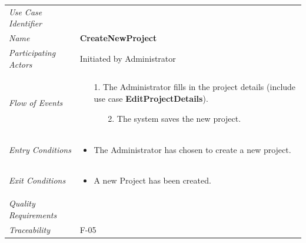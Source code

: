 \documentclass[12pt,letterpaper]{article}
\begin{document}
\begin{center}
	\begin{tabu} to 
		\toprule
		Use Case Identifier & \createnewproject{} \\
		Name & {\bf CreateNewProject} \\
		Participating Actors & Initiated by Administrator \\
		Flow of Events & 
	    \begin{enumerate}[topsep=-1em,leftmargin=*]
		    \item[1.] The Administrator fills in the project details (include use case \textbf{EditProjectDetails}).
		    \begin{enumerate}
		        \item[2.] The system saves the new project.
		    \end{enumerate}
		\end{enumerate} \\

		Entry Conditions &
		\begin{itemize}[topsep=-1em,leftmargin=*]
		    \item The Administrator has chosen to create a new project.
        \end{itemize} \\

		Exit Conditions &
		\begin{itemize}[topsep=-1em,leftmargin=*]
		    \item A new Project has been created.
        \end{itemize} \\

		Quality Requirements & \\

		Traceability & F-05 \\
		\toprule
	\end{tabu}
\end{center}
\end{document}
